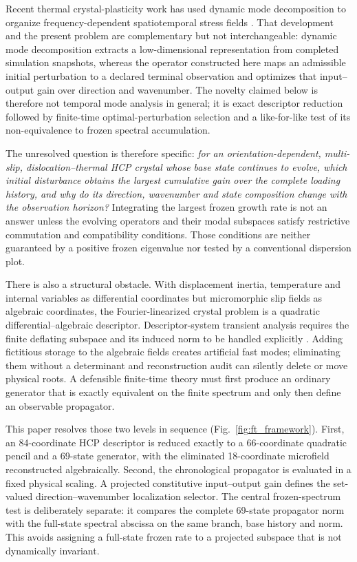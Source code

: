 Recent thermal crystal-plasticity work has used dynamic mode decomposition to
organize frequency-dependent spatiotemporal stress fields
\cite{OhashiAoyagi2026}.  That development and the present problem are
complementary but not interchangeable: dynamic mode decomposition extracts a
low-dimensional representation from completed simulation snapshots, whereas
the operator constructed here maps an admissible initial perturbation to a
declared terminal observation and optimizes that input--output gain over
direction and wavenumber.  The novelty claimed below is therefore not temporal
mode analysis in general; it is exact descriptor reduction followed by
finite-time optimal-perturbation selection and a like-for-like test of its
non-equivalence to frozen spectral accumulation.

The unresolved question is therefore specific: \emph{for an orientation-dependent, multi-slip, dislocation--thermal HCP crystal whose base state continues to evolve, which initial disturbance obtains the largest cumulative gain over the complete loading history, and why do its direction, wavenumber and state composition change with the observation horizon?} Integrating the largest frozen growth rate is not an answer unless the evolving operators and their modal subspaces satisfy restrictive commutation and compatibility conditions. Those conditions are neither guaranteed by a positive frozen eigenvalue nor tested by a conventional dispersion plot.

There is also a structural obstacle. With displacement inertia, temperature and internal variables as differential coordinates but micromorphic slip fields as algebraic coordinates, the Fourier-linearized crystal problem is a quadratic differential--algebraic descriptor. Descriptor-system transient analysis requires the finite deflating subspace and its induced norm to be handled explicitly \cite{EmbreeKeeler2017}. Adding fictitious storage to the algebraic fields creates artificial fast modes; eliminating them without a determinant and reconstruction audit can silently delete or move physical roots. A defensible finite-time theory must first produce an ordinary generator that is exactly equivalent on the finite spectrum and only then define an observable propagator.

This paper resolves those two levels in sequence (Fig.~\ref{fig:ft_framework}). First, an 84-coordinate HCP descriptor is reduced exactly to a 66-coordinate quadratic pencil and a 69-state generator, with the eliminated 18-coordinate microfield reconstructed algebraically. Second, the chronological propagator is evaluated in a fixed physical scaling. A projected constitutive input--output gain defines the set-valued direction--wavenumber localization selector. The central frozen-spectrum test is deliberately separate: it compares the complete 69-state propagator norm with the full-state spectral abscissa on the same branch, base history and norm. This avoids assigning a full-state frozen rate to a projected subspace that is not dynamically invariant.

